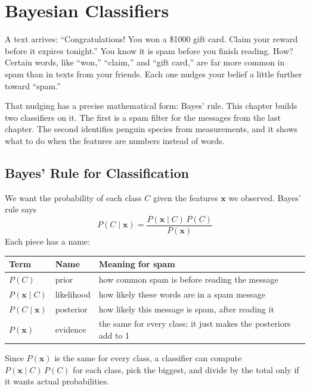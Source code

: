 \chapter{Bayesian Classifiers}

A text arrives: ``Congratulations! You won a \$1000 gift card. Claim your reward before it expires tonight.''
You know it is spam before you finish reading. How? Certain words, like ``won,'' ``claim,'' and ``gift card,''
are far more common in spam than in texts from your friends. Each one nudges your belief a little further
toward ``spam.''

That nudging has a precise mathematical form: Bayes' rule. This chapter builds two classifiers on it. The first
is a spam filter for the messages from the last chapter. The second identifies penguin species from
measurements, and it shows what to do when the features are numbers instead of words.

\section{Bayes' Rule for Classification}
We want the probability of each class $C$ given the features $\mathbf{x}$ we observed. Bayes' rule says
$$P(C \mid \mathbf{x}) = \frac{P(\mathbf{x} \mid C)\,P(C)}{P(\mathbf{x})}$$
Each piece has a name:

\begin{center}
\begin{tabular}{l l >{\raggedright\arraybackslash}p{6cm}}
\textbf{Term} & \textbf{Name} & \textbf{Meaning for spam} \\
\hline
$P(C)$ & prior\index{prior probability} & how common spam is before reading the message \\
$P(\mathbf{x} \mid C)$ & likelihood & how likely these words are in a spam message \\
$P(C \mid \mathbf{x})$ & posterior & how likely this message is spam, after reading it \\
$P(\mathbf{x})$ & evidence & the same for every class; it just makes the posteriors add to 1 \\
\end{tabular}
\end{center}

Since $P(\mathbf{x})$ is the same for every class, a classifier can compute $P(\mathbf{x} \mid C)\,P(C)$ for each
class, pick the biggest, and divide by the total only if it wants actual probabilities.

